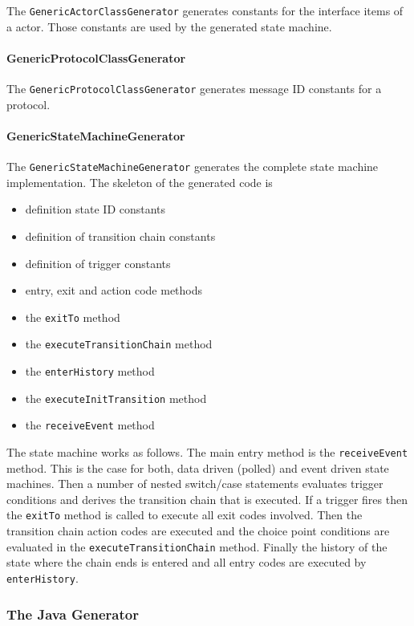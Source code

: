 The \texttt{GenericActorClassGenerator} generates constants for the interface items of a actor. Those constants are used by the generated state machine.

\paragraph{GenericProtocolClassGenerator}

The \texttt{GenericProtocolClassGenerator} generates message ID constants for a protocol.

\paragraph{GenericStateMachineGenerator}

The \texttt{GenericStateMachineGenerator} generates the complete state machine implementation. The skeleton of the generated code is

\begin{itemize}
\item definition state ID constants
\item definition of transition chain constants
\item definition of trigger constants
\item entry, exit and action code methods
\item the \texttt{exitTo} method 
\item the \texttt{executeTransitionChain} method
\item the \texttt{enterHistory} method
\item the \texttt{executeInitTransition} method
\item the \texttt{receiveEvent} method
\end{itemize}

The state machine works as follows. The main entry method is the \texttt{receiveEvent} method. This is the case for both, data driven (polled) and event driven state machines. Then a number of nested switch/case statements evaluates trigger conditions and derives the transition chain that is executed. If a trigger fires then the \texttt{exitTo} method is called to execute all exit codes involved. Then the transition chain action codes are executed and the choice point conditions are evaluated in the \texttt{executeTransitionChain} method. Finally the history of the state where the chain ends is entered and all entry codes are executed by \texttt{enterHistory}.

\subsubsection{The Java Generator}


